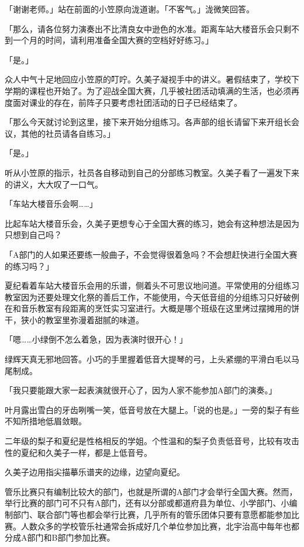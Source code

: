 \documentclass[UTF8]{ctexart}
\begin{document}
    「谢谢老师。」站在前面的小笠原向泷道谢。「不客气。」泷微笑回答。 

    「那么，请各位努力演奏出不比清良女中逊色的水准。距离车站大楼音乐会只剩不到一个月的时间，请利用准备全国大赛的空档好好练习。」 

    「是。」 

    众人中气十足地回应小笠原的叮咛。久美子凝视手中的讲义。暑假结束了，学校下学期的课程也开始了。为了迎战全国大赛，几乎被社团活动填满的生活，也必须再度面对课业的存在，前阵子只要考虑社团活动的日子已经结束了。 

    「那么今天就讨论到这里，接下来开始分组练习。各声部的组长请留下来开组长会议，其他的社员请各自练习。」 

    「是。」 

    听从小笠原的指示，社员各自移动到自己的分部练习教室。久美子看了一遍发下来的讲义，大大叹了一口气。 

    「车站大楼音乐会啊……」 

    比起车站大楼音乐会，久美子更想专心于全国大赛的练习，她会有这种想法是因为只想到自己吗？ 

    「A部门的人如果还要练一般曲子，不会觉得很着急吗？不会想赶快进行全国大赛的练习吗？」 

    夏纪看着车站大楼音乐会用的乐谱，侧着头不可思议地问道。平常使用的分组练习教室因为还要处理文化祭的善后工作，不能使用，今天低音组的分组练习只好破例在和音乐教室有段距离的烹饪实习室进行。大概是哪个班级在这里烤过摆摊用的饼干，狭小的教室里弥漫着甜腻的味道。 

    「嗯……小绿倒不怎么着急，因为表演时很开心！」 

    绿辉天真无邪地回答。小巧的手里握着低音大提琴的弓，上头紧绷的平滑白毛以马尾制成。 

    「我只要能跟大家一起表演就很开心了，因为人家不能参加A部门的演奏。」 

    叶月露出雪白的牙齿咧嘴一笑，低音号放在大腿上。「说的也是。」一旁的梨子有些不知所措地低眉敛眼。 

    二年级的梨子和夏纪是性格相反的学姐。个性温和的梨子负责低音号，比较有攻击性的夏纪和久美子一样，都是上低音号。 

    久美子边用指尖描摹乐谱夹的边缘，边望向夏纪。 

    管乐比赛只有编制比较大的部门，也就是所谓的A部门才会举行全国大赛。然而，举行比赛的部门可不只有A部门，还有以分部或都道府县为单位、小学部门、小编制部门、联合部门等也都会举行比赛，几乎所有的管乐团体只要有意愿都能参加比赛。人数众多的学校管乐社通常会拆成好几个单位参加比赛，北宇治高中每年也都分成A部门和B部门参加比赛。 
\end{document}
